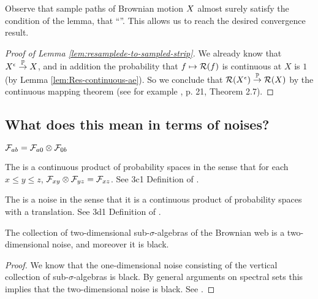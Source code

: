 {Observe that sample paths of Brownian motion $X$ almost surely
satisfy the condition of the lemma, that
``\stripleavetimenotturningpoint{\sampled}''.  This allows us to reach
the desired convergence result.

\begin{proof}[Proof of Lemma \ref{lem:resamplede-to-sampled-strip}]
  We already know that $X^{\epsilon} \overset{\mathbb{P}}\to X$, and in addition
  the probability that $f \mapsto \mathcal{R}(f)$ is continuous at $X$ is $1$
  (by Lemma \ref{lem:Res-continuous-ae}).
  So we conclude that $\mathcal{R}(X^{\epsilon}) \overset{\mathbb{P}}\to
  \mathcal{R}(X)$ by the continuous mapping theorem (see for
  example \cite{billingsley}, p. 21, Theorem 2.7).
\end{proof}

\subsection{What does this mean in terms of noises?}

\begin{theorem}
  $\mathcal{F}_{a b} = \mathcal{F}_{a 0} \otimes \mathcal{F}_{0 b}$
\end{theorem}

\begin{theorem}
  The \brownianwebnoise{}
  is a continuous product of probability spaces in the sense that
  for each $x \le y \le z$, $\mathcal{F}_{x y} \otimes \mathcal{F}_{y z} =
  \mathcal{F}_{x z}$.
  See 3c1 Definition of
  \cite{tsirelson-nonclassical-stochastic-flows}.
\end{theorem}

\begin{theorem}
  The \brownianwebnoise{} is a noise in the sense that it is a
  continuous product of probability spaces with a translation.
  See 3d1 Definition of
  \cite{tsirelson-nonclassical-stochastic-flows}.
\end{theorem}


\begin{theorem}
  The collection of two-dimensional sub-$\sigma$-algebras of the
  Brownian web is a two-dimensional noise, and moreover it is black.
\end{theorem}

\begin{proof}
  We know that the one-dimensional noise consisting of the vertical
  collection of sub-$\sigma$-algebras is black.  By general arguments
  on spectral sets this implies that the two-dimensional noise is
  black.  See \cite{tsirelson-classicality-blackness-spectrum}.
\end{proof}

}

